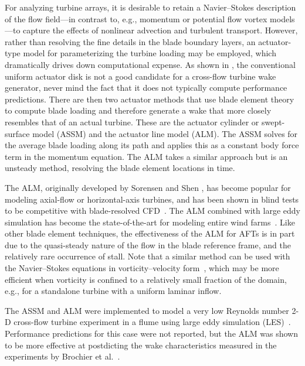 \documentclass[times]{weauth}
\begin{document}
For analyzing turbine arrays, it is desirable to retain a Navier--Stokes
description of the flow field---in contrast to, e.g., momentum or potential flow
vortex models---to capture the effects of nonlinear advection and turbulent
transport. However, rather than resolving the fine details in the blade boundary
layers, an actuator-type model for parameterizing the turbine loading may be
employed, which dramatically drives down computational expense. As shown in
\cite{Bachant2015-JoT}, the conventional uniform actuator disk is not a good
candidate for a cross-flow turbine wake generator, never mind the fact that it
does not typically compute performance predictions. There are then two actuator
methods that use blade element theory to compute blade loading and therefore
generate a wake that more closely resembles that of an actual turbine. These are
the actuator cylinder or swept-surface model (ASSM) and the actuator line model
(ALM). The ASSM solves for the average blade loading along its path and applies
this as a constant body force term in the momentum equation. The ALM takes a
similar approach but is an unsteady method, resolving the blade element
locations in time.

The ALM, originally developed by Sorensen and Shen \cite{Sorensen2002}, has
become popular for modeling axial-flow or horizontal-axis turbines, and has been
shown in blind tests to be competitive with blade-resolved
CFD~\cite{Krogstad2013, Pierella2014}. The ALM combined with large eddy
simulation has become the state-of-the-art for modeling entire wind
farms~\cite{Archer2013, Churchfield2012, Sorensen2015, Fleming2013,
Fleming2014}. Like other blade element techniques, the effectiveness of the ALM
for AFTs is in part due to the quasi-steady nature of the flow in the blade
reference frame, and the relatively rare occurrence of stall. Note that a
similar method can be used with the Navier--Stokes equations in
vorticity--velocity form~\cite{Scheurich2011b}, which may be more efficient when
vorticity is confined to a relatively small fraction of the domain, e.g., for a
standalone turbine with a uniform laminar inflow.

The ASSM and ALM were implemented to model a very low Reynolds number 2-D
cross-flow turbine experiment in a flume using large eddy simulation
(LES)~\cite{Shamsoddin2014}. Performance predictions for this case were not
reported, but the ALM was shown to be more effective at postdicting the wake
characteristics measured in the experiments by Brochier et
al.~\cite{Brochier1986}.
\end{document}
